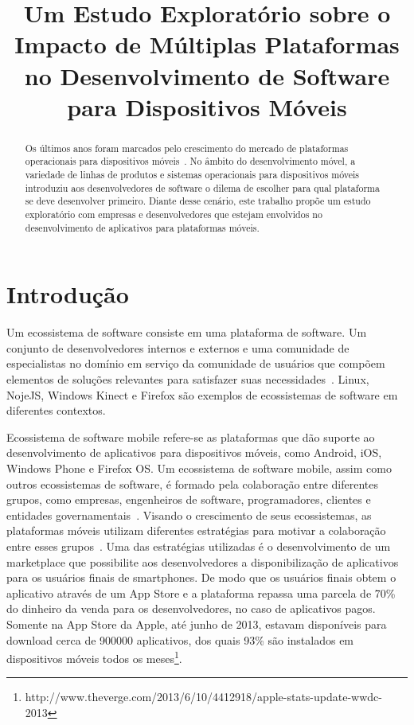 \documentclass[conference]{IEEEtran}
\begin{document}
\title{Um Estudo Exploratório sobre o Impacto de Múltiplas Plataformas no Desenvolvimento de Software para Dispositivos Móveis}

\author{
}

\maketitle


\begin{abstract}
Os últimos anos foram marcados pelo crescimento do mercado de plataformas operacionais para dispositivos móveis~\cite{Butler2011}. No âmbito do desenvolvimento móvel, a variedade de linhas de produtos e sistemas operacionais para dispositivos móveis introduziu aos desenvolvedores de software o dilema de escolher para qual plataforma se deve desenvolver primeiro. Diante desse cenário, este trabalho propõe um estudo exploratório com empresas e desenvolvedores que estejam envolvidos no desenvolvimento de aplicativos para plataformas móveis.
\end{abstract}

\IEEEpeerreviewmaketitle



\section{Introdução}

Um ecossistema de software consiste em uma plataforma de software. Um conjunto de desenvolvedores internos e externos e uma comunidade de especialistas no domínio em serviço da comunidade de usuários que compõem elementos de soluções relevantes para satisfazer suas necessidades~\cite{Bosch201067}. Linux, NojeJS, Windows Kinect e Firefox são exemplos de ecossistemas de software em diferentes contextos. 

Ecossistema de software mobile refere-se as plataformas que dão suporte ao desenvolvimento de aplicativos para dispositivos móveis, como Android, iOS, Windows Phone e Firefox OS. Um ecossistema de software mobile, assim como outros ecossistemas de software, é formado pela colaboração entre diferentes grupos, como empresas, engenheiros de software, programadores, clientes e entidades governamentais~\cite{Jansen2013,Scacchi2012}. Visando o crescimento de seus ecossistemas, as plataformas móveis utilizam diferentes estratégias para motivar a colaboração entre esses grupos~\cite{Corral2014}. Uma das estratégias utilizadas é o desenvolvimento de um marketplace que possibilite aos desenvolvedores a disponibilização de aplicativos para os usuários finais de smartphones. De modo que os usuários finais obtem o aplicativo através de um App Store e a plataforma repassa uma parcela de 70\% do dinheiro da venda para os desenvolvedores, no caso de aplicativos pagos. Somente na App Store da Apple, até junho de 2013, estavam disponíveis para download cerca de 900000 aplicativos, dos quais 93\% são instalados em dispositivos móveis todos os meses\footnote{http://www.theverge.com/2013/6/10/4412918/apple-stats-update-wwdc-2013}. 
  
\end{document}
